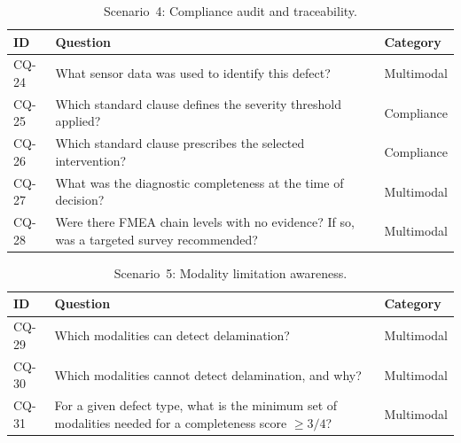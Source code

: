 \documentclass[11pt,a4paper]{article}
\begin{document}
\begin{table}[htbp]
\centering
\caption{Scenario~4: Compliance audit and traceability.}
\label{tab:cq-scenario4}
\begin{tabularx}{\linewidth}{@{}l X l@{}}
\toprule
\textbf{ID} & \textbf{Question} & \textbf{Category} \\
\midrule
CQ-24 & What sensor data was used to identify this defect? &
  Multimodal \\
CQ-25 & Which standard clause defines the severity threshold applied? &
  Compliance \\
CQ-26 & Which standard clause prescribes the selected intervention? &
  Compliance \\
CQ-27 & What was the diagnostic completeness at the time of decision? &
  Multimodal \\
CQ-28 & Were there FMEA chain levels with no evidence? If so, was a
  targeted survey recommended? & Multimodal \\
\bottomrule
\end{tabularx}
\end{table}


\begin{table}[htbp]
\centering
\caption{Scenario~5: Modality limitation awareness.}
\label{tab:cq-scenario5}
\begin{tabularx}{\linewidth}{@{}l X l@{}}
\toprule
\textbf{ID} & \textbf{Question} & \textbf{Category} \\
\midrule
CQ-29 & Which modalities can detect delamination? & Multimodal \\
CQ-30 & Which modalities cannot detect delamination, and why? &
  Multimodal \\
CQ-31 & For a given defect type, what is the minimum set of modalities
  needed for a completeness score $\geq 3/4$? & Multimodal \\
\bottomrule
\end{tabularx}
\end{table}

\end{document}
